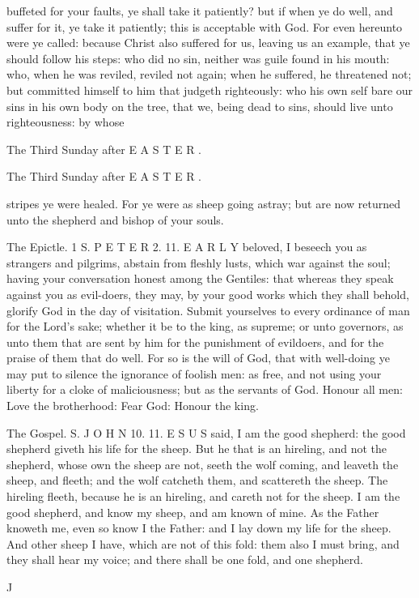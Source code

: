 buffeted for your faults, ye shall take it patiently? but if when ye do well, and suffer for it, ye take it patiently; this is acceptable with God. For even hereunto were ye called: because Christ also suffered for us, leaving us an example, that ye should follow his steps: who did no sin, neither was guile found in his mouth: who, when he was reviled, reviled not again; when he suffered, he threatened not; but committed himself to him that judgeth righteously: who his own self bare our sins in his own body on the tree, that we, being dead to sins, should live unto righteousness: by whose

The Third Sunday after E A S T E R .

The Third Sunday after E A S T E R .

stripes ye were healed. For ye were as sheep going astray; but are now returned unto the shepherd and bishop of your souls.

The Epictle. 1 S. P E T E R 2. 11. E A R L Y beloved, I beseech you as strangers and pilgrims, abstain from fleshly lusts, which war against the soul; having your conversation honest among the Gentiles: that whereas they speak against you as evil-doers, they may, by your good works which they shall behold, glorify God in the day of visitation. Submit yourselves to every ordinance of man for the Lord’s sake; whether it be to the king, as supreme; or unto governors, as unto them that are sent by him for the punishment of evildoers, and for the praise of them that do well. For so is the will of God, that with well-doing ye may put to silence the ignorance of foolish men: as free, and not using your liberty for a cloke of maliciousness; but as the servants of God. Honour all men: Love the brotherhood: Fear God: Honour the king.

The Gospel. S. J O H N 10. 11. E S U S said, I am the good shepherd: the good shepherd giveth his life for the sheep. But he that is an hireling, and not the shepherd, whose own the sheep are not, seeth the wolf coming, and leaveth the sheep, and fleeth; and the wolf catcheth them, and scattereth the sheep. The hireling fleeth, because he is an hireling, and careth not for the sheep. I am the good shepherd, and know my sheep, and am known of mine. As the Father knoweth me, even so know I the Father: and I lay down my life for the sheep. And other sheep I have, which are not of this fold: them also I must bring, and they shall hear my voice; and there shall be one fold, and one shepherd.

J

